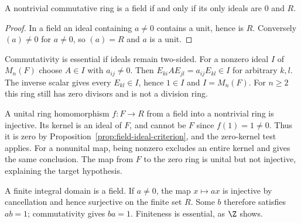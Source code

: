 \begin{proposition}\label{prop:field-ideal-criterion}
A nontrivial commutative ring is a field if and only if its only ideals
are $0$ and $R$.
\end{proposition}
\begin{proof}
In a field an ideal containing $a\ne0$ contains a unit, hence is $R$.
Conversely $(a)\ne0$ for $a\ne0$, so $(a)=R$ and $a$ is a unit.
\end{proof}
Commutativity is essential if ideals remain two-sided. For a nonzero
ideal $I$ of $M_n(F)$ choose $A\in I$ with $a_{ij}\ne0$. Then
$E_{ki}AE_{jl}=a_{ij}E_{kl}\in I$ for arbitrary $k,l$.
The inverse scalar gives every $E_{kl}\in I$, hence $1\in I$ and
$I=M_n(F)$. For $n\ge2$ this ring still has zero divisors and is not
a division ring.

A unital ring homomorphism $f:F\to R$ from a field into a nontrivial
ring is injective. Its kernel is an ideal of $F$, and cannot be $F$
since $f(1)=1\ne0$. Thus it is zero by
Proposition~\ref{prop:field-ideal-criterion}, and the zero-kernel test
applies. For a nonunital map, being nonzero excludes an entire kernel
and gives the same conclusion. The map from $F$ to the zero ring is
unital but not injective, explaining the target hypothesis.

A finite integral domain is a field. If $a\ne0$, the map $x\mapsto ax$
is injective by cancellation and hence surjective on the finite set $R$.
Some $b$ therefore satisfies $ab=1$; commutativity gives $ba=1$.
Finiteness is essential, as $\Z$ shows.

